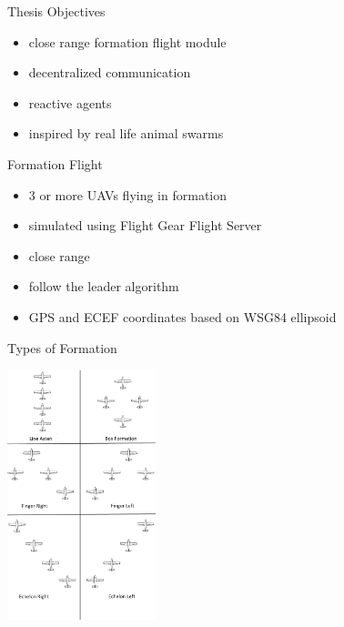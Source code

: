 \documentclass{beamer}
\begin{document}
\begin{frame}{Thesis Objectives}
\begin{itemize}
\item close range formation flight module
\item decentralized communication
\item reactive agents
\item inspired by real life animal swarms
\end{itemize}
\end{frame}

\begin{frame}{Formation Flight}
\begin{itemize}
\item 3 or more UAVs flying in formation
\item simulated using Flight Gear Flight Server
\item close range
\item follow the leader algorithm
\item GPS and ECEF coordinates based on WSG84 ellipsoid
\end{itemize}
\end{frame}

\begin{frame}{Types of Formation}
\begin{center}
\includegraphics[width=1.7in]{img/4form.png}
\end{center}
\end{frame}
\end{document}
